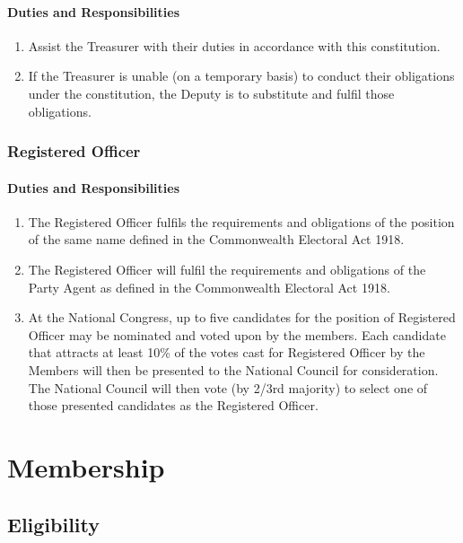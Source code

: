 \documentclass[a4paper,titlepage,8.5pt]{article}
\begin{document}
\paragraph{Duties and Responsibilities}

\begin{enumerate}
\item Assist the Treasurer with their duties in accordance with this constitution.
\item If the Treasurer is unable (on a temporary basis) to conduct their obligations under the constitution, the Deputy is to substitute and fulfil those obligations.
\end{enumerate}

\subsubsection{Registered Officer}

\paragraph{Duties and Responsibilities}
\begin{enumerate}
\item The Registered Officer fulfils the requirements and obligations of the position of the same name defined in the Commonwealth Electoral Act 1918.
\item The Registered Officer will fulfil the requirements and obligations of the Party Agent as defined in the Commonwealth Electoral Act 1918.
\item At the National Congress, up to five candidates for the position of Registered Officer may be nominated and voted upon by the members. Each candidate that attracts at least 10\% of the votes cast for Registered Officer by the Members will then be presented to the National Council for consideration. The National Council will then vote (by 2/3rd majority) to select one of those presented candidates as the Registered Officer.
\end{enumerate}


\section{Membership}

\subsection{Eligibility}
\end{document}
